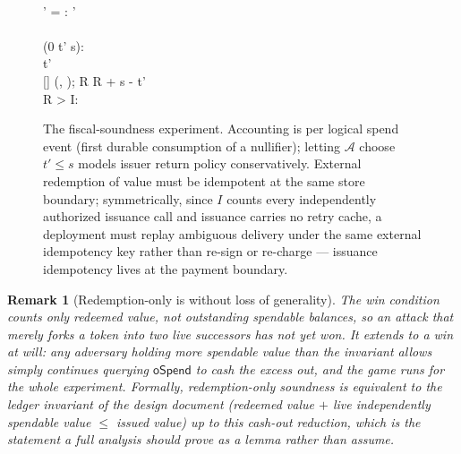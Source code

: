 \documentclass[11pt]{article}
\newtheorem{remark}{Remark}
\newcommand{\Null}{\mathsf{N}}
\newcommand{\adv}{\mathcal{A}}
\begin{document}
\begin{figure}[H]
\begin{pcvstack}[boxed]
{    \\
 \pcind \pcif {}' = : \pcreturn {}'
   \quad {} \\
 \pcind \pcreturn \bot \\
 \pcif {}  
   \;\vee\; \neg(0 \le t' \le s): \pcreturn \bot \\
  \gets {} t' \\
 [\Null] \gets (, ); \quad
   R \gets R + s - t' \\
 \pcif R > I:   \\
 \pcreturn {}}
\end{pcvstack}
\caption{The fiscal-soundness experiment. Accounting is per logical spend
event (first durable consumption of a nullifier); letting $\adv$ choose
$t' \le s$ models issuer return policy conservatively. External redemption
of value must be idempotent at the same store boundary; symmetrically,
since $I$ counts every independently authorized issuance call and issuance
carries no retry cache, a deployment must replay ambiguous delivery under the
same external idempotency key rather than re-sign or re-charge --- issuance
idempotency lives at the payment boundary.}
\label{fig:fiscal}
\end{figure}

\begin{remark}[Redemption-only is without loss of generality]
The win condition counts only \emph{redeemed} value, not outstanding
spendable balances, so an attack that merely \emph{forks} a token into two
live successors has not yet won. It extends to a win at will: any
adversary holding more spendable value than the invariant allows simply
continues querying $\mathsf{oSpend}$ to cash the excess out, and the game
runs for the whole experiment. Formally, redemption-only soundness is
equivalent to the ledger invariant of the design document
(redeemed value $+$ live independently spendable value $\le$ issued value)
up to this cash-out reduction, which is the statement a full analysis
should prove as a lemma rather than assume.
\end{remark}
\end{document}
